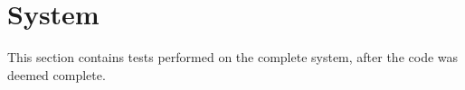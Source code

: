 \section{System}
This section contains tests performed on the complete system, after the code was deemed complete.